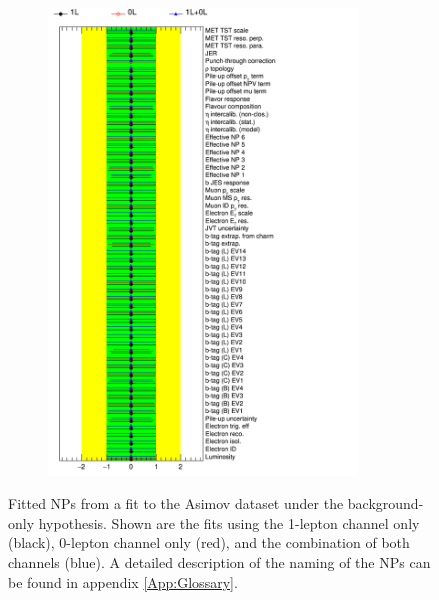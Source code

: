 \begin{figure}[htb!]
\begin{subfigure}{0.5\textwidth}
  \includegraphics[width=0.9\textwidth]{figures/VLQ/NuisPar_comp_Detectoruncertainties_Asimov.png}
  \caption*{}
  \label{}
\end{subfigure}
\captionsetup{width=0.85\textwidth} \caption{\small Fitted NPs from a fit to the Asimov dataset under the background-only hypothesis. Shown are the fits using the 1-lepton channel only (black), 0-lepton channel only (red), and the combination of both channels (blue). A detailed description of the naming of the NPs can be found in appendix \ref{App:Glossary}.}
\label{sec:vlq:fig:asimovfit}
\end{figure}

